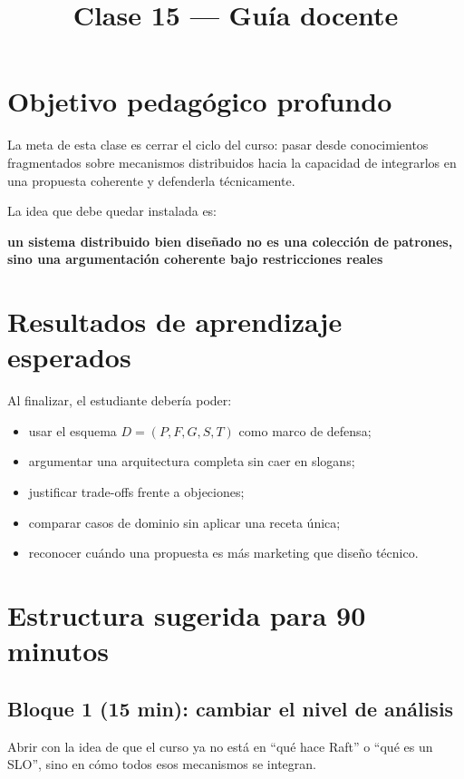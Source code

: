 \documentclass[variant=docente,cover=institutional,mode=screen]{ua-engineering-v6-article}
\title{Clase 15 --- Guía docente}
\author{\UAProfessor}
\date{\UADate}
\begin{document}
\maketitle

\section{Objetivo pedagógico profundo}

La meta de esta clase es cerrar el ciclo del curso: pasar desde conocimientos fragmentados sobre mecanismos distribuidos hacia la capacidad de integrarlos en una propuesta coherente y defenderla técnicamente.

La idea que debe quedar instalada es:

\begin{center}
\textbf{un sistema distribuido bien diseñado no es una colección de patrones, sino una argumentación coherente bajo restricciones reales}
\end{center}

\section{Resultados de aprendizaje esperados}

Al finalizar, el estudiante debería poder:

\begin{itemize}
\item usar el esquema $D=(P,F,G,S,T)$ como marco de defensa;
\item argumentar una arquitectura completa sin caer en slogans;
\item justificar trade-offs frente a objeciones;
\item comparar casos de dominio sin aplicar una receta única;
\item reconocer cuándo una propuesta es más marketing que diseño técnico.
\end{itemize}

\section{Estructura sugerida para 90 minutos}

\subsection*{Bloque 1 (15 min): cambiar el nivel de análisis}
Abrir con la idea de que el curso ya no está en “qué hace Raft” o “qué es un SLO”, sino en cómo todos esos mecanismos se integran.
\end{document}
